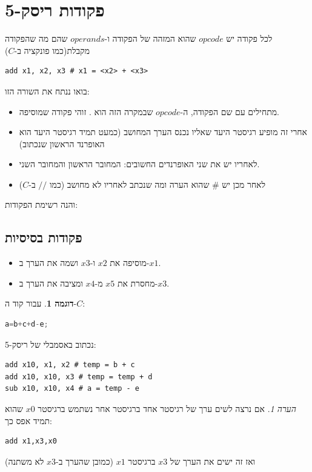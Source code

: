 \documentclass[12pt]{article}
\theoremstyle{plain}
\theoremstyle{definition}
\newtheorem{example}[theorem]{דוגמה}      %
\theoremstyle{remark}
\newtheorem*{remark}{הערה}                %
\begin{document}
\section{פקודות ריסק-5}
לכל פקודה יש \({opcode}\) שהוא המזהה של הפקודה ו-\({operands}\) שהם מה שהפקודה מקבלת(כמו פונקציה ב-\({C}\))\begin{LTR}\begin{lstlisting}[language=riscv]
add x1, x2, x3 # x1 = <x2> + <x3>

\end{lstlisting}\end{LTR}בואו ננתח את השורה הזו:\begin{itemize}
\item מתחילים עם שם הפקודה, ה-\({opcode}\) שבמקרה הזה הוא . זוהי פקודה שמוסיפה.
\item אחרי זה מופיע רגיסטר היעד שאליו נכנס הערך המחושב (כמעט תמיד רגיסטר היעד הוא האופרנד הראשון שנכתוב)
\item לאחריו יש את שני האופרנדים החשובים: המחובר הראשון והמחובר השני.
\item לאחר מכן יש \({\#}\) שהוא הערה ומה שנכתב לאחריו לא מחושב (כמו \({//}\) ב-\({C}\))
\end{itemize}
והנה רשימת הפקודות:\subsection{פקודות בסיסיות}
\begin{itemize}
\item מוסיפה את \({x2}\) ו-\({x3}\) ושמה את הערך ב-\({x1}\).
\item מחסרת את \({x5}\) מ-\({x4}\) ומציבה את הערך ב-\({x3}\).
\end{itemize}
\begin{example}
עבור קוד ה-\({C}\):\begin{LTR}\begin{lstlisting}[language=c]
a=b+c+d-e;

\end{lstlisting}\end{LTR}נכתוב באסמבלי של ריסק-5:\begin{LTR}\begin{lstlisting}[language=riscv]
add x10, x1, x2 # temp = b + c
add x10, x10, x3 # temp = temp + d
sub x10, x10, x4 # a = temp - e

\end{lstlisting}\end{LTR}
\end{example}
\begin{remark}
אם נרצה לשים ערך של רגיסטר אחד ברגיסטר אחר נשתמש ברגיסטר \({x0}\) שהוא תמיד אפס כך:\begin{LTR}\begin{lstlisting}[language=assembly]
add x1,x3,x0

\end{lstlisting}\end{LTR}ואז זה ישים את הערך של \({x3}\) ברגיסטר \({x1}\) (כמובן שהערך ב-\({x3}\) לא משתנה)
\end{remark}
\end{document}
